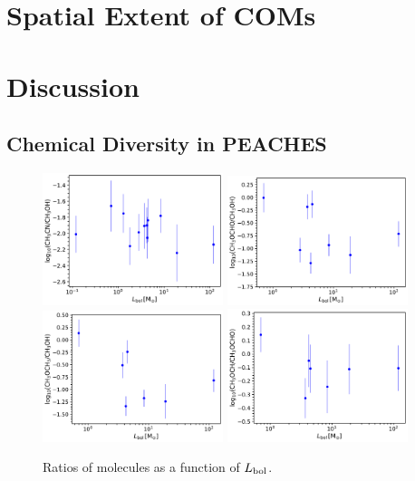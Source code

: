 \documentclass[twocolumn]{aastex62}
\newcommand{\lbol}{\mbox{$L_{\rm bol}$}}
\newcommand{\methylformate}{\mbox{CH$_{3}$OCHO}}
\begin{document}

\section{Spatial Extent of COMs}
\section{Discussion}

\subsection{Chemical Diversity in PEACHES}
\begin{figure}[htbp!]
  \centering
  \includegraphics[width=0.47\textwidth]{ratio_ch3cn_ch3oh_lbol.pdf}
  \includegraphics[width=0.47\textwidth]{ratio_ch3ocho_ch3oh_lbol.pdf}
  \includegraphics[width=0.47\textwidth]{ratio_ch3och3_ch3oh_lbol.pdf}
  \includegraphics[width=0.47\textwidth]{ratio_ch3och3_ch3ocho_lbol.pdf}
  \caption{Ratios of molecules as a function of \lbol.}
  \label{fig:ratio_lbol}
\end{figure}
\end{document}
